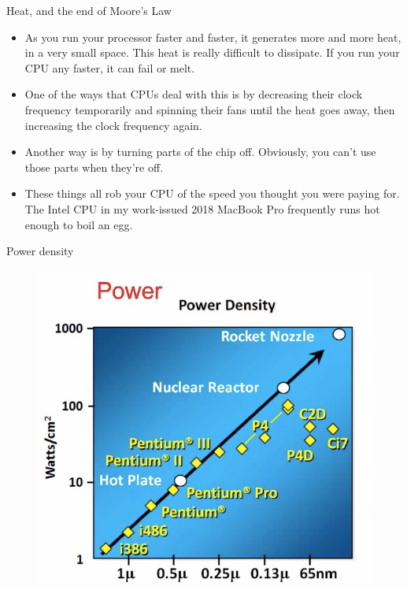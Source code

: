 \documentclass{beamer}
\begin{document}
\begin{frame}{Heat, and the end of Moore's Law}
	\begin{itemize}
	\item As you run your processor faster and faster, it generates more and more heat, in a
	very small space. This heat is really difficult to dissipate. If you run your
	CPU any faster, it can fail or melt.

	\item One of the ways that CPUs deal with this is by decreasing their clock
	frequency temporarily and spinning their fans until the heat goes away, then
	increasing the clock frequency again.
	
	\item Another way is by turning parts of the chip off. Obviously, you can't use
	those parts when they're off.

	\item These things all rob your CPU of the speed you thought you were paying
	for.  The Intel CPU in my work-issued 2018 MacBook Pro frequently runs hot enough to boil
	an egg.
	
	\end{itemize}
\end{frame}

\begin{frame}{Power density}
	\begin{figure}
		\includegraphics[scale=0.3]{Power_Density.jpg}
	\end{figure}
\end{frame}
\end{document}
